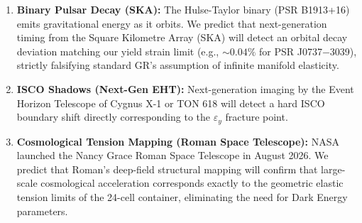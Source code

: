\documentclass[11pt, letterpaper, openany]{book}
\begin{document}
\begin{enumerate}
    \item \textbf{Binary Pulsar Decay (SKA):} The Hulse-Taylor binary (PSR B1913+16) emits gravitational energy as it orbits. We predict that next-generation timing from the Square Kilometre Array (SKA) will detect an orbital decay deviation matching our yield strain limit (e.g., $\sim 0.04\%$ for PSR J0737−3039), strictly falsifying standard GR's assumption of infinite manifold elasticity.
    
    \item \textbf{ISCO Shadows (Next-Gen EHT):} Next-generation imaging by the Event Horizon Telescope of Cygnus X-1 or TON 618 will detect a hard ISCO boundary shift directly corresponding to the $\varepsilon_y$ fracture point.
    
    \item \textbf{Cosmological Tension Mapping (Roman Space Telescope):} NASA launched the Nancy Grace Roman Space Telescope in August 2026. We predict that Roman's deep-field structural mapping will confirm that large-scale cosmological acceleration corresponds exactly to the geometric elastic tension limits of the 24-cell container, eliminating the need for Dark Energy parameters.
\end{enumerate}

\vspace{0.5cm}
\begin{center}
\end{center}
\end{document}

